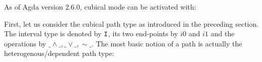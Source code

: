 As of Agda version 2.6.0, cubical mode can be activated with:
\begin{code}%
\>[0]\AgdaSymbol{\{-\#}\AgdaSpace{}%
\AgdaSpace{}%
\AgdaSpace{}%
\AgdaSymbol{\#-\}}\<%
\end{code}
First, let us consider the cubical path type as introduced in the preceding
section. The interval type is denoted by $\texttt{I}$, its two end-points by $i0$ and
$i1$ and the operations by $\_\land\_, \_\lor\_, \sim\_$. The most basic notion
of a path is actually the heterogenous/dependent path type:
\begin{code}[hide]%
\>[0]\AgdaSpace{}%
\AgdaModule{\AgdaUnderscore{}}\AgdaSpace{}%
\<%
\\
\>[0]\AgdaSpace{}%
\AgdaSpace{}%
\<%
\\
\>[0][@{}l@{\AgdaIndent{0}}]%
\>[2]\AgdaSymbol{(}\AgdaSpace{}%
\AgdaSymbol{;}\AgdaSpace{}%
\AgdaSymbol{)}\<%
\\
\>[0]\AgdaSpace{}%
\AgdaSpace{}%
\<%
\\
\>[0][@{}l@{\AgdaIndent{0}}]%
\>[2]\AgdaSymbol{(}\AgdaSymbol{)}\<%
\\
\>[0]\AgdaSpace{}%
\AgdaSpace{}%
\<%
\\
\>[0]\AgdaSpace{}%
\AgdaSpace{}%
\<%
\\
\>[0]\AgdaSpace{}%
\<%
\\
\>[0]\AgdaSpace{}%
\AgdaSpace{}%
\<%
\\
\>[0]\<%
\\
\>[0][@{}l@{\AgdaIndent{0}}]%
\>[2]\AgdaSpace{}%
\AgdaSymbol{:}\AgdaSpace{}%
\<%
\\
\>[0]\<%
\end{code}
\begin{code}%
\>[0][@{}l@{\AgdaIndent{1}}]%
\>[2]\AgdaSpace{}%
\AgdaSymbol{:}\AgdaSpace{}%
\AgdaSymbol{(}\AgdaSpace{}%
\AgdaSymbol{:}\AgdaSpace{}%
\AgdaSpace{}%
\AgdaSpace{}%
\AgdaSymbol{)}\AgdaSpace{}%
\AgdaSpace{}%
\AgdaSpace{}%
\AgdaSpace{}%
\AgdaSpace{}%
\AgdaSpace{}%
\AgdaSpace{}%
\AgdaSpace{}%
\<%
\end{code}
